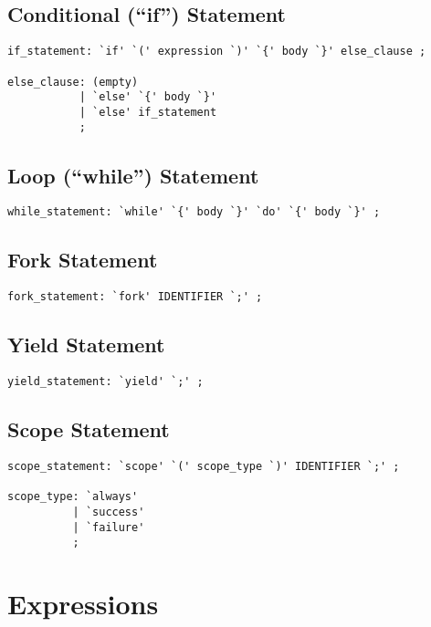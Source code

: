 \documentclass{article}
\begin{document}
\subsection{Conditional (``if'') Statement}

\begin{lstlisting}
if_statement: `if' `(' expression `)' `{' body `}' else_clause ;

else_clause: (empty)
           | `else' `{' body `}'
           | `else' if_statement
           ;
\end{lstlisting}

\subsection{Loop (``while'') Statement}

\begin{lstlisting}
while_statement: `while' `{' body `}' `do' `{' body `}' ;
\end{lstlisting}

\subsection{Fork Statement}

\begin{lstlisting}
fork_statement: `fork' IDENTIFIER `;' ;
\end{lstlisting}

\subsection{Yield Statement}

\begin{lstlisting}
yield_statement: `yield' `;' ;
\end{lstlisting}

\subsection{Scope Statement}

\begin{lstlisting}
scope_statement: `scope' `(' scope_type `)' IDENTIFIER `;' ;

scope_type: `always'
          | `success'
          | `failure'
          ;
\end{lstlisting}

\section{Expressions}
\end{document}
